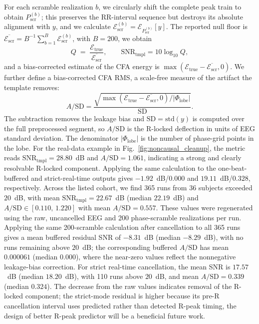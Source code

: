 \documentclass[conference]{IEEEtran}
\begin{document}
For each scramble realization
$b$, we circularly shift the complete peak train to obtain $P_{\mathrm{scr}}^{(b)}$; this preserves
the RR-interval sequence but destroys its absolute alignment with $y$, and we calculate
$\mathcal{E}_{\mathrm{scr}}^{(b)}=\mathcal{E}_{P_{\mathrm{scr}}^{(b)}}[y]$. The reported null floor is
$\overline{\mathcal{E}_{\mathrm{scr}}}=B^{-1}\sum_{b=1}^{B}\mathcal{E}_{\mathrm{scr}}^{(b)}$,
with $B=200$, we obtain
\begin{equation}
Q \;=\; \frac{\mathcal{E}_{\mathrm{true}}}{\overline{\mathcal{E}_{\mathrm{scr}}}},
\qquad
\mathrm{SNR}_{\mathrm{tmpl}} = 10\log_{10} Q,
\label{eq:Q}
\end{equation}
and a bias-corrected estimate of the CFA energy is
$\max(\mathcal{E}_{\mathrm{true}}-\overline{\mathcal{E}_{\mathrm{scr}}},0)$.
We further define a bias-corrected CFA RMS, a scale-free measure of the artifact the template removes:
\begin{equation}
A/\mathrm{SD} = \frac{\sqrt{\max(\mathcal{E}_{\mathrm{true}}-\overline{\mathcal{E}_{\mathrm{scr}}},0)/|\Phi_{\mathrm{lobe}}|}}{\mathrm{SD}}.
\end{equation}
The subtraction removes the leakage bias and $\mathrm{SD}=\mathrm{std}(y)$ is computed over the full
preprocessed segment, so $A/\mathrm{SD}$ is the R-locked deflection in units of EEG standard deviation.
The denominator $|\Phi_{\mathrm{lobe}}|$ is the number of phase-grid points in the lobe. For the real-data example in Fig.~\ref{fig:noncausal_cleanup}, the metric reads
$\mathrm{SNR}_{\mathrm{tmpl}}=28.80$~dB and $A/\mathrm{SD}=1.061$, indicating a strong and clearly resolvable R-locked component.
Applying the same calculation to the one-beat-buffered and strict-real-time outputs gives
$-1.92$~dB/$0.000$ and $19.11$~dB/$0.328$, respectively. 
Across the listed cohort, we find 365 runs from 36 subjects exceeded $20$~dB, with mean
$\mathrm{SNR}_{\mathrm{tmpl}}=22.67$~dB (median $22.19$~dB) and
$A/\mathrm{SD}\in[0.110,\,1.220]$ with mean $A/\mathrm{SD}=0.557$. These values were
regenerated using the raw, uncancelled EEG and 200 phase-scramble realizations per run.
Applying the same 200-scramble calculation after cancellation to all 365 runs gives a mean
buffered residual SNR of $-8.31$~dB (median $-8.29$~dB), with no runs remaining above
$20$~dB; the corresponding buffered $A/\mathrm{SD}$ has mean $0.000061$ (median $0.000$),
where the near-zero values reflect the nonnegative leakage-bias correction. For strict
real-time cancellation, the mean SNR is $17.57$~dB (median $18.20$~dB), with 110 runs above
$20$~dB, and mean $A/\mathrm{SD}=0.339$ (median $0.324$). The decrease from the raw values
indicates removal of the R-locked component; the strict-mode residual is higher because its
pre-R cancellation interval uses predicted rather than detected R-peak timing, the design of 
better R-peak predictor will be a beneficial future work.
\end{document}
